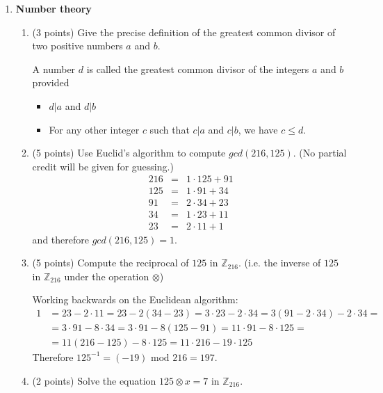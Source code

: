 \documentclass[12pt]{article}
\begin{document}
\begin{enumerate}
\item \textbf{Number theory}
\begin{enumerate}
\item (3 points) Give the precise definition of the greatest common divisor of two positive numbers $a$ and $b$.\vspace{0.5cm}

A number $d$ is called the greatest common divisor of the integers $a$ and $b$ provided
\begin{itemize}
\item $d|a$ and $d|b$
\item For any other integer $c$ such that $c|a$ and $c|b$, we have $c\leq d$.
\end{itemize}\vspace{1cm}
\item (5 points) Use Euclid's algorithm to compute $gcd(216,125)$. (No partial credit will be given for guessing.)\vspace{0.5cm}
\[
\begin{array}{rcl}
216&=&1\cdot 125+91\\
125&=&1\cdot 91+34\\
91&=&2\cdot 34+23\\
34&=&1\cdot 23+11\\
23&=&2\cdot 11+1
\end{array}
\]
and therefore $gcd(216,125)=1$.\vspace{0.5cm}
\item (5 points) Compute the reciprocal of $125$ in $\mathbb{Z}_{216}$. (i.e. the inverse of $125$ in $\mathbb{Z}_{216}$ under the operation $\otimes$)

Working backwards on the Euclidean algorithm:
\begin{align*}
1&=23-2\cdot 11=23-2(34-23)=3\cdot 23-2\cdot 34=3(91-2\cdot 34)-2\cdot 34=\\
&=3\cdot 91-8\cdot 34=3\cdot 91-8(125-91)=11\cdot 91-8\cdot 125=\\
&=11(216-125)-8\cdot 125=11\cdot 216-19\cdot 125
\end{align*}
Therefore $125^{-1}=(-19)\textrm{ mod }216=197$.
\item (2 points) Solve the equation $125\otimes x=7$ in $\mathbb{Z}_{216}$.


\end{enumerate}
\end{enumerate}
\end{document}

